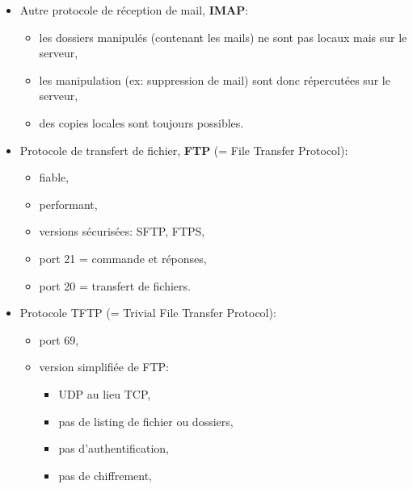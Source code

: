 \documentclass[a4paper]{article}
\begin{document}
\begin{itemize}
\item Autre protocole de réception de mail, \textbf{IMAP}:
\begin{itemize}
    \item les dossiers manipulés (contenant les mails) ne sont pas locaux mais sur le serveur,
    \item les manipulation (ex: suppression de mail) sont donc répercutées sur le serveur,
    \item des copies locales sont toujours possibles.
\end{itemize}





\item Protocole de transfert de fichier, \textbf{FTP} (= File Transfer Protocol):
\begin{itemize}
    \item fiable,
    \item performant,
    \item versions sécurisées: SFTP, FTPS,
    \item port 21 = commande et réponses,
    \item port 20 = transfert de fichiers.
\end{itemize}





\item Protocole TFTP (= Trivial File Transfer Protocol):
\begin{itemize}
    \item port 69,
    \item version simplifiée de FTP:
    \begin{itemize}
        \item UDP au lieu TCP,
        \item pas de listing de fichier ou dossiers,
        \item pas d'authentification,
        \item pas de chiffrement,
    \end{itemize}
\end{itemize}





\end{itemize}
\end{document}

